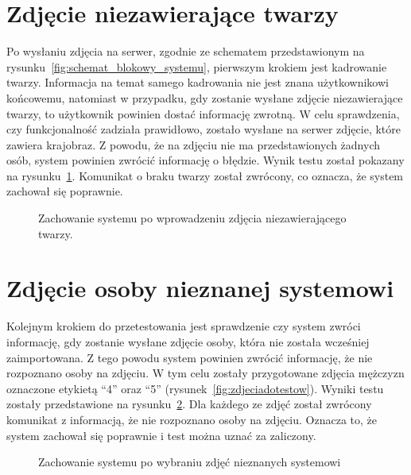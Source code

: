 \pagebreak


\section{Zdjęcie niezawierające twarzy}

Po wysłaniu zdjęcia na serwer, zgodnie ze schematem przedstawionym na rysunku~\ref{fig:schemat_blokowy_systemu},
pierwszym krokiem jest kadrowanie twarzy.
Informacja na temat samego kadrowania nie jest znana użytkownikowi końcowemu, natomiast w przypadku,
gdy zostanie wysłane zdjęcie niezawierające twarzy, to użytkownik powinien dostać informację zwrotną.
W celu sprawdzenia, czy funkcjonalność zadziała prawidłowo, zostało wysłane na serwer zdjęcie, które zawiera krajobraz.
Z powodu, że na zdjęciu nie ma przedstawionych żadnych osób, system powinien zwrócić informację o błędzie.
Wynik testu został pokazany na rysunku~\ref{fig:wprowadzona_natura}.
Komunikat o braku twarzy został zwrócony, co oznacza, że system zachował się poprawnie.

\begin{figure}[H]
    \centering
    \caption{ Zachowanie systemu po wprowadzeniu zdjęcia niezawierającego twarzy. }
    \customsource
    \label{fig:wprowadzona_natura}
\end{figure}

\pagebreak


\section{Zdjęcie osoby nieznanej systemowi}

Kolejnym krokiem do przetestowania jest sprawdzenie czy system zwróci informację,
gdy zostanie wysłane zdjęcie osoby, która nie została wcześniej zaimportowana.
Z tego powodu system powinien zwrócić informację, że nie rozpoznano osoby na zdjęciu.
W tym celu zostały przygotowane zdjęcia mężczyzn oznaczone etykietą ``4'' oraz ``5'' (rysunek~\ref{fig:zdjeciadotestow}).
Wyniki testu zostały przedstawione na rysunku~\ref{fig:rezultat_nieznane}.
Dla każdego ze zdjęć został zwrócony komunikat z informacją, że nie rozpoznano osoby na zdjęciu.
Oznacza to, że system zachował się poprawnie i test można uznać za zaliczony.

\begin{figure}[H]
    \centering
    \caption{ Zachowanie systemu po wybraniu zdjęć nieznanych systemowi }
    \customsource
    \label{fig:rezultat_nieznane}
\end{figure}

